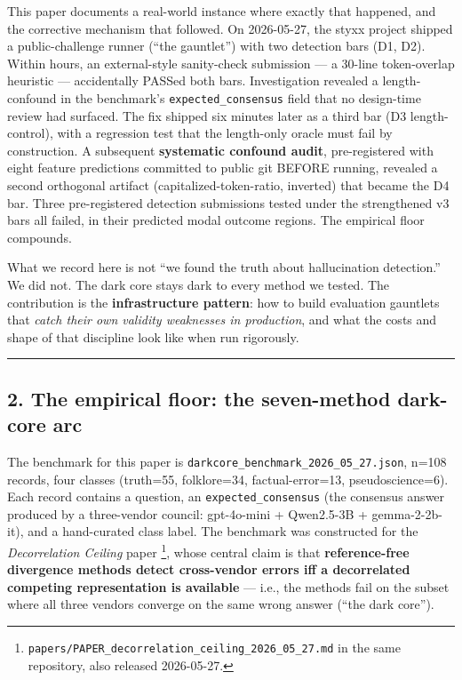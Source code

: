 \documentclass[
]{article}
\begin{document}
This paper documents a real-world instance where exactly that happened,
and the corrective mechanism that followed. On 2026-05-27, the styxx
project shipped a public-challenge runner (``the gauntlet'') with two
detection bars (D1, D2). Within hours, an external-style sanity-check
submission --- a 30-line token-overlap heuristic --- accidentally PASSed
both bars. Investigation revealed a length-confound in the benchmark's
\texttt{expected\_consensus} field that no design-time review had
surfaced. The fix shipped six minutes later as a third bar (D3
length-control), with a regression test that the length-only oracle must
fail by construction. A subsequent \textbf{systematic confound audit},
pre-registered with eight feature predictions committed to public git
BEFORE running, revealed a second orthogonal artifact
(capitalized-token-ratio, inverted) that became the D4 bar. Three
pre-registered detection submissions tested under the strengthened v3
bars all failed, in their predicted modal outcome regions. The empirical
floor compounds.

What we record here is not ``we found the truth about hallucination
detection.'' We did not. The dark core stays dark to every method we
tested. The contribution is the \textbf{infrastructure pattern}: how to
build evaluation gauntlets that \emph{catch their own validity
weaknesses in production}, and what the costs and shape of that
discipline look like when run rigorously.

\begin{center}\rule{0.5\linewidth}{0.5pt}\end{center}

\subsection{2. The empirical floor: the seven-method dark-core
arc}\label{the-empirical-floor-the-seven-method-dark-core-arc}

The benchmark for this paper is
\texttt{darkcore\_benchmark\_2026\_05\_27.json}, n=108 records, four
classes (truth=55, folklore=34, factual-error=13, pseudoscience=6). Each
record contains a question, an \texttt{expected\_consensus} (the
consensus answer produced by a three-vendor council: gpt-4o-mini +
Qwen2.5-3B + gemma-2-2b-it), and a hand-curated class label. The
benchmark was constructed for the \emph{Decorrelation Ceiling} paper
\footnote{\texttt{papers/PAPER\_decorrelation\_ceiling\_2026\_05\_27.md}
  in the same repository, also released 2026-05-27.}, whose central
claim is that \textbf{reference-free divergence methods detect
cross-vendor errors iff a decorrelated competing representation is
available} --- i.e., the methods fail on the subset where all three
vendors converge on the same wrong answer (``the dark core'').
\end{document}
